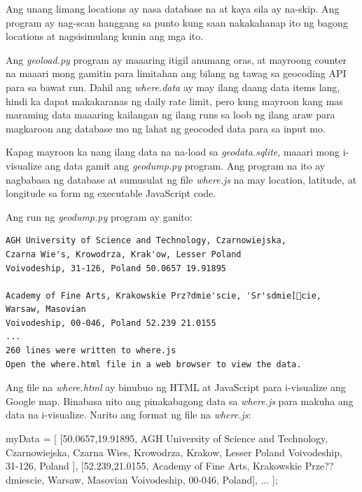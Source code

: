 \documentclass[10pt,]{book}
\newenvironment{Shaded}{}{}
\newcommand{\BaseNTok}[1]{\textcolor[rgb]{0.25,0.63,0.44}{#1}}
\newcommand{\DecValTok}[1]{\textcolor[rgb]{0.25,0.63,0.44}{#1}}
\newcommand{\FloatTok}[1]{\textcolor[rgb]{0.25,0.63,0.44}{#1}}
\newcommand{\NormalTok}[1]{#1}
\newcommand{\OperatorTok}[1]{\textcolor[rgb]{0.40,0.40,0.40}{#1}}
\newcommand{\StringTok}[1]{\textcolor[rgb]{0.25,0.44,0.63}{#1}}
\begin{document}
Ang unang limang locations ay nasa database na at kaya sila ay na-skip.
Ang program ay nag-scan hanggang sa punto kung saan nakakahanap ito ng
bagong locations at nagsisimulang kunin ang mga ito.

Ang \emph{geoload.py} program ay maaaring itigil anumang oras, at
mayroong counter na maaari mong gamitin para limitahan ang bilang ng
tawag sa geocoding API para sa bawat run. Dahil ang \emph{where.data} ay
may ilang daang data items lang, hindi ka dapat makakaranas ng daily
rate limit, pero kung mayroon kang mas maraming data maaaring kailangan
ng ilang runs sa loob ng ilang araw para magkaroon ang database mo ng
lahat ng geocoded data para sa input mo.

Kapag mayroon ka nang ilang data na na-load sa \emph{geodata.sqlite},
maaari mong i-visualize ang data gamit ang \emph{geodump.py} program.
Ang program na ito ay nagbabasa ng database at sumusulat ng file
\emph{where.js} na may location, latitude, at longitude sa form ng
executable JavaScript code.

Ang run ng \emph{geodump.py} program ay ganito:

{\small
\begin{verbatim}
AGH University of Science and Technology, Czarnowiejska,
Czarna Wie's, Krowodrza, Krak'ow, Lesser Poland
Voivodeship, 31-126, Poland 50.0657 19.91895

Academy of Fine Arts, Krakowskie Prz?dmie'scie, 'Sr'sdmie[cie, Warsaw, Masovian
Voivodeship, 00-046, Poland 52.239 21.0155
...
260 lines were written to where.js
Open the where.html file in a web browser to view the data.
\end{verbatim}
}

Ang file na \emph{where.html} ay binubuo ng HTML at JavaScript para
i-visualize ang Google map. Binabasa nito ang pinakabagong data sa
\emph{where.js} para makuha ang data na i-visualize. Narito ang format
ng file na \emph{where.js}:

\begin{Shaded}
\begin{Highlighting}[]
\NormalTok{myData }\OperatorTok{=}\NormalTok{ [}
\NormalTok{[}\FloatTok{50.0657}\OperatorTok{,}\FloatTok{19.91895}\OperatorTok{,}
\StringTok{\textquotesingle{}AGH University of Science and Technology, Czarnowiejska,}
\NormalTok{Czarna Wie}\StringTok{\textquotesingle{}s, Krowodrza, Krak\textquotesingle{}}\NormalTok{ow}\OperatorTok{,}\NormalTok{ Lesser Poland}
\NormalTok{Voivodeship}\OperatorTok{,} \DecValTok{31}\OperatorTok{{-}}\DecValTok{126}\OperatorTok{,}\NormalTok{ Poland }\StringTok{\textquotesingle{}],}
\NormalTok{[}\FloatTok{52.239}\OperatorTok{,}\FloatTok{21.0155}\OperatorTok{,}
\StringTok{\textquotesingle{}Academy of Fine Arts, Krakowskie Prze??dmie\textquotesingle{}}\NormalTok{scie}\OperatorTok{,}\NormalTok{ Warsaw}\OperatorTok{,}
\NormalTok{Masovian Voivodeship}\OperatorTok{,} \DecValTok{00}\OperatorTok{{-}}\BaseNTok{046}\OperatorTok{,}\NormalTok{ Poland}\StringTok{\textquotesingle{}],}
   \OperatorTok{...}
\NormalTok{]}\OperatorTok{;}
\end{Highlighting}
\end{Shaded}
\end{document}

